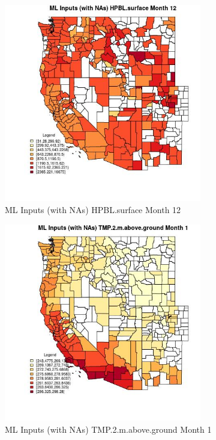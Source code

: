 \begin{figure} 
\centering  
\includegraphics[width=0.77\textwidth]{Code_Outputs/Report_ML_input_PM25_Step4_part_f_de_duplicated_aveswNAs_CountyHPBLsurfacemedianMonth12.jpg} 
\caption{\label{fig:Report_ML_input_PM25_Step4_part_f_de_duplicated_aveswNAsCountyHPBLsurfacemedianMonth12}ML Inputs (with NAs) HPBL.surface Month 12} 
\end{figure} 
 

\begin{figure} 
\centering  
\includegraphics[width=0.77\textwidth]{Code_Outputs/Report_ML_input_PM25_Step4_part_f_de_duplicated_aveswNAs_CountyTMP2mabovegroundmedianMonth1.jpg} 
\caption{\label{fig:Report_ML_input_PM25_Step4_part_f_de_duplicated_aveswNAsCountyTMP2mabovegroundmedianMonth1}ML Inputs (with NAs) TMP.2.m.above.ground Month 1} 
\end{figure} 
 

